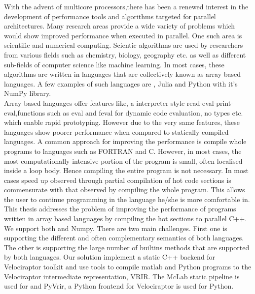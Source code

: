With the advent of multicore processors,there has been a renewed interest in the development of performance tools and algorithms targeted for parallel architectures. Many research areas  provide a wide variety of problems which would show improved performance when executed in parallel. One such area is scientific and numerical computing. Scientic algorithms are used by researchers from various fields such as chemistry, biology, geography etc. as well as different sub-fields of computer science like machine learning. In most cases, these algorithms are written in languages  that are collectively known as  array based languages. A few examples of such languages are \matlab\cite{matlab}, Julia\cite{julia} and Python\cite{python} with it's NumPy\cite{numpy} library.\\
Array based languages offer features like, a interpreter style read-eval-print-eval,functions such as eval and feval for dynamic code evaluation,  no types etc. which enable rapid prototyping. However due to the very same features, these languages show poorer performance when compared to statically compiled languages. A common approach for improving the performance is compile whole programs to languages such as {\sc FORTRAN} and C. However, in most cases, the most computationally intensive portion of the program is small, often localised inside a loop body. Hence compiling the entire program is not necessary. In most cases speed up observed through partial compilation of hot code sections is commensurate with that observed by compiling the whole program. This allows the user to continue programming in the language he/she is more comfortable in.\\
This thesis addresses the problem of improving the performance of programs written in array based languages by compiling the hot sections to parallel C++. We support both \matlab\cite{matlab} and Numpy\cite{numpy}. There are two main challenges. First one is supporting the different and often complementary semantics of both languages. The other is supporting the large number of builtins methods that are supported by both languages.
Our solution implement a static C++ backend for Velociraptor\cite{velociraptor} toolkit and use tools to compile matlab\cite{matlab} and Python\cite{python} programs to the Velociraptor\cite{velociraptor} intermediate representation, VRIR. The McLab static pipeline is used for \matlab\cite{matlab} and PyVrir, a Python\cite{python} frontend for Velociraptor\cite{velociraptor} is used for Python\cite{python}. 
